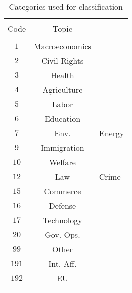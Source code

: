 
\begin{table}[!htbp] \centering 
  \caption{Categories used for classification} 
  \label{tab:issue_categories} 
\begin{tabular}{@{\extracolsep{5pt}} cc} 
\\[-1.8ex]\hline 
\hline \\[-1.8ex] 
Code & Topic \\ 
\hline \\[-1.8ex] 
$1$ & Macroeconomics \\ 
$2$ & Civil Rights \\ 
$3$ & Health \\ 
$4$ & Agriculture \\ 
$5$ & Labor \\ 
$6$ & Education \\ 
$7$ & Env. & Energy \\ 
$9$ & Immigration \\ 
$10$ & Welfare \\ 
$12$ & Law & Crime \\ 
$15$ & Commerce \\ 
$16$ & Defense \\ 
$17$ & Technology \\ 
$20$ & Gov. Ops. \\ 
$99$ & Other \\ 
$191$ & Int. Aff. \\ 
$192$ & EU \\ 
\hline \\[-1.8ex] 
\end{tabular} 
\end{table} 
